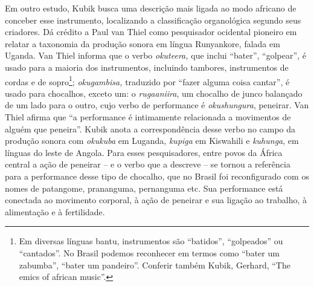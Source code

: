 Em outro estudo, Kubik busca uma descrição mais ligada ao modo africano
de conceber esse instrumento, localizando a classificação organológica
segundo seus criadores. Dá crédito a Paul van Thiel como pesquisador
ocidental pioneiro em relatar a taxonomia da produção sonora em língua
Runyankore, falada em Uganda. Van Thiel informa que o verbo
\emph{okuteera,} que inclui ``bater'', ``golpear'', é usado para a
maioria dos instrumentos, incluindo tambores, instrumentos de cordas e
de sopro\footnote{Em diversas línguas bantu, instrumentos são
  ``batidos'', ``golpeados'' ou ``cantados''. No Brasil podemos
  reconhecer em termos como ``bater um zabumba'', ``bater um pandeiro''.
  Conferir também Kubik, Gerhard, ``The emics of african music''.};
\emph{okugambisa,} traduzido por ``fazer alguma coisa cantar'', é usado
para chocalhos, exceto um: o \emph{rugaaniira}, um chocalho de junco
balançado de um lado para o outro, cujo verbo de performance é
\emph{okushungura}, peneirar. Van Thiel afirma que ``a performance é
intimamente relacionada a movimentos de alguém que peneira''. Kubik
anota a correspondência desse verbo no campo da produção sonora com
\emph{okukuba} em Luganda, \emph{kupiga} em Kiswahili e \emph{kuhunga},
em línguas do leste de Angola. Para esses pesquisadores, entre povos da
África central a ação de peneirar -- e o verbo que a descreve -- se
tornou a referência para a performance desse tipo de chocalho, que no
Brasil foi reconfigurado com os nomes de patangome, prananguma,
pernanguma etc. Sua performance está conectada ao movimento corporal, à
ação de peneirar e sua ligação ao trabalho, à alimentação e à
fertilidade.

